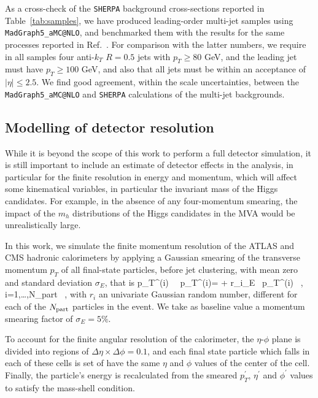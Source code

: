 As a cross-check of the {\tt SHERPA}
background cross-sections reported in Table~\ref{tab:samples}, we have produced leading-order
multi-jet samples
using {\tt MadGraph5\_aMC@NLO}, and
benchmarked them with the results for the same processes reported in
Ref.~\cite{Alwall:2014hca}.
%
For comparison with the latter numbers, 
we require in all samples four anti-$k_T$ $R=0.5$ jets with $p_T \ge 80 $ GeV, and the leading jet must have $p_T \ge 100$ GeV, and
also that all jets must be within an acceptance of $|\eta| \le 2.5 $.
%
We find good agreement, within the scale uncertainties, between the {\tt MadGraph5\_aMC@NLO} and {\tt SHERPA} calculations of the multi-jet
backgrounds.


\subsection{Modelling of detector resolution}


While it is beyond the scope of this work to perform a full
detector simulation, it is still important to include an estimate of detector
effects in the analysis, in particular for the finite resolution
in energy and momentum, which will affect some kinematical variables, in particular
the invariant mass of the Higgs candidates.
%
For example, in the absence of any four-momentum smearing, the impact of the $m_h$
distributions of the Higgs candidates in the MVA
would be unrealistically large.


In this work, we simulate the finite momentum resolution of the ATLAS and CMS
hadronic calorimeters by applying a Gaussian smearing of the transverse
momentum $p_T$ of all
final-state particles, before jet clustering,
with mean zero and standard deviation $\sigma_E$, that is
%
\be
\label{eq:smearing}
p_T^{(i)} \, \to \, p_T^{(i)\prime}= + r_i\cdot\sigma_E \rp\, p_T^{(i)} \, , \quad
i=1,\ldots,N_{\rm part} \, ,
\ee
with $r_i$ an univariate Gaussian random number, different for each
of the $N_{\rm part}$ particles in the event.
%
We take as baseline value a momentum smearing
factor of $\sigma_E=5\%$.
%


To account for the finite angular resolution of the calorimeter,
the $\eta$-$\phi$ plane is divided into regions of
$\Delta \eta \times \Delta \phi=0.1$, and each final state particle
which falls in each of these cells is set of have the same $\eta$
and $\phi$ values of the center of the cell.
%
Finally, the particle's energy is recalculated from the smeared $p_T^\prime$,
$\eta^\prime$ and $\phi^\prime$ values to satisfy the mass-shell
condition.


